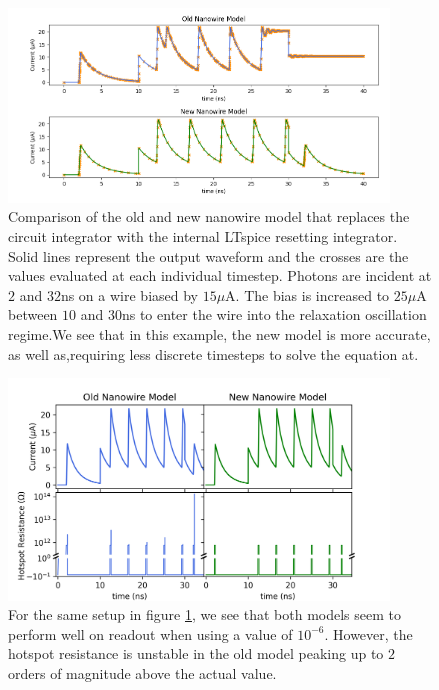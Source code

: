 \begin{figure}
    \centering
    \includegraphics[width=0.9\textwidth]{figs/int_improvement_1e-3.png}
    \caption{Comparison of the old and new nanowire model that replaces the
    circuit integrator with the internal LTspice resetting integrator. Solid
    lines represent the output waveform and the crosses are the values evaluated at each
    individual timestep. Photons are incident at $2$ and $32$ns on a wire biased by $15\mu$A.
    The bias is increased to $25\mu$A between $10$ and $30$ns to enter the wire into the
    relaxation oscillation regime.We see that in this example, the new model is more accurate, as well as,requiring less discrete timesteps to solve the equation at.}
    \label{fig:int_improvement_1e-3}
\end{figure}

\begin{figure}
    \centering
    \includegraphics[width=0.9\textwidth]{figs/int_improvement_1e-6.png}
    \caption{For the same setup in figure \ref{fig:int_improvement_1e-3}, we see
    that both models seem to perform well on readout when using a  value
    of $10^{-6}$. However, the hotspot resistance is unstable in the old model peaking
    up to $2$ orders of magnitude above the actual value.}
    \label{fig:int_improvement_1e-6}
\end{figure}

